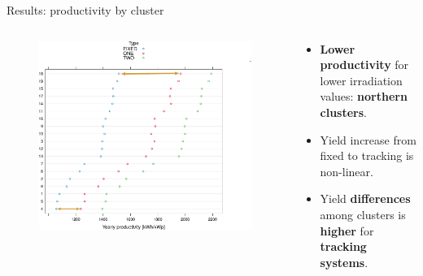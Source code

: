 \documentclass{beamer}%
\begin{document}
\begin{frame}[fragile]{Results: productivity by cluster}
  \begin{columns}
    \begin{column}{0.5\textwidth}
      \begin{figure}
        \includegraphics[scale=0.35]{productivity_bycluster_andtype2.pdf}
      \end{figure}
\end{column}
\begin{column}{0.5\textwidth}
\vspace{1.5\baselineskip}  
 \begin{itemize}
 \item \textbf{Lower productivity} for lower irradiation values: \textbf{northern clusters}.
  \item Yield increase from fixed to tracking is \alert{non-linear}. 
  \item Yield \textbf{differences} among clusters is \textbf{higher} for \textbf{\alert{tracking systems}}.
  \end{itemize}  
   \end{column}
  \end{columns}
\end{frame}
\end{document}
